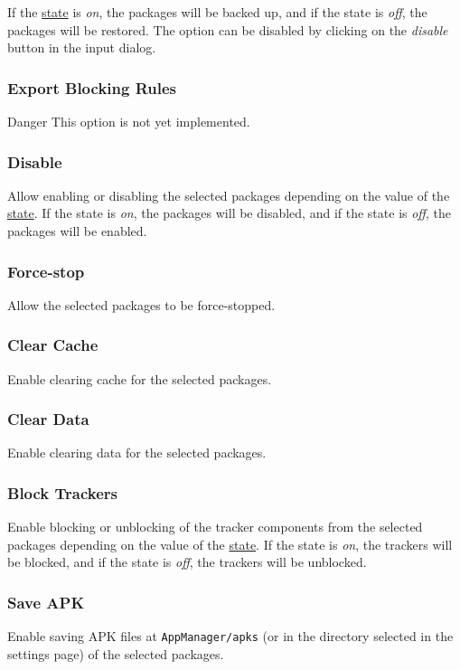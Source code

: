 If the \hyperref[subsubsec:profile-state]{state} is \textit{on}, the packages will be backed up, and if the state is
\textit{off}, the packages will be restored. The option can be disabled by clicking on the \textit{disable} button in
the input dialog.

\subsubsection{Export Blocking Rules} %
\begin{danger}{Danger}
    This option is not yet implemented.
\end{danger}

\subsubsection{Disable} %
Allow enabling or disabling the selected packages depending on the value of the \hyperref[subsubsec:profile-state]{state}.
If the state is \textit{on}, the packages will be disabled, and if the state is \textit{off}, the packages will be enabled.

\subsubsection{Force-stop} %
Allow the selected packages to be force-stopped.

\subsubsection{Clear Cache} %
Enable clearing cache for the selected packages.

\subsubsection{Clear Data} %
Enable clearing data for the selected packages.

\subsubsection{Block Trackers} %
Enable blocking or unblocking of the tracker components from the selected packages depending on the value of the \hyperref[subsubsec:profile-state]{state}.
If the state is \textit{on}, the trackers will be blocked, and if the state is \textit{off}, the trackers will be unblocked.

\subsubsection{Save APK} %
Enable saving APK files at \texttt{AppManager/apks} (or in the directory selected in the settings page) of the selected packages.
